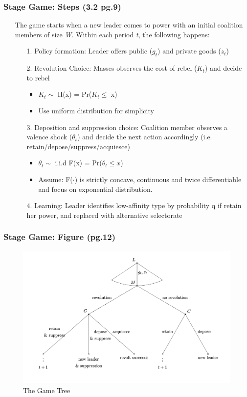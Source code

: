 \documentclass[10pt,handout]{beamer}
\begin{document}
\begin{frame}
\frametitle{Stage Game: Steps (3.2 pg.9)}
\begin{itemize}
    \item[] The game starts when a new leader comes to power with an initial coalition members of size \textit{W}. Within each period \textit{t}, the following happens:
    \begin{itemize}
        \item[1.] Policy formation: Leader offers public ($g_t$) and private goods ($z_t$)
        \item[2.] Revolution Choice: Masses observes the cost of rebel ($K_t$) and decide to rebel
        \begin{itemize}
            \item $K_t \sim$ H(x) = Pr($K_t \leq$ x)
            \item Use uniform distribution for simplicity
        \end{itemize}
        \item[3.] Deposition and suppression choice: Coalition member observes a valence shock ($\theta_t$) and decide the next action accordingly (i.e. retain/depose/suppress/acquiesce)
        \begin{itemize}
            \item $\theta_t \sim$ i.i.d F(x) = Pr($\theta_t \leq x$)
            \item Assume: F($\cdot$) is strictly concave, continuous and twice differentiable and focus on exponential distribution.
        \end{itemize}
        \item[4.] Learning: Leader identifies low-affinity type by probability q if retain her power, and replaced with alternative selectorate
    \end{itemize}
\end{itemize}
\end{frame}
\begin{frame}
\frametitle{Stage Game: Figure (pg.12)}
\begin{figure}
    \centering
    \includegraphics[width=0.93\linewidth]{Figure_1.jpeg}
    \caption{The Game Tree}
    \label{fig:enter-label}
\end{figure}
\end{frame}
\end{document}

